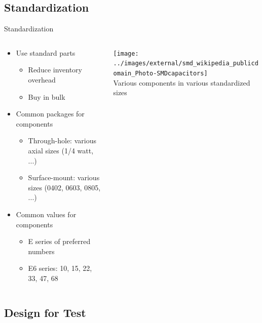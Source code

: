 \documentclass{beamer}
\begin{document}
\subsection{Standardization}
\begin{frame}{Standardization}
  \begin{columns}[T]
    \begin{column}{.6\textwidth}
      \begin{itemize}
        \item Use standard parts
        \begin{itemize}
          \item Reduce inventory overhead
          \item Buy in bulk
        \end{itemize}
        \item Common packages for components
        \begin{itemize}
          \item Through-hole: various axial sizes (1/4 watt, ...)
          \item Surface-mount: various sizes (0402, 0603, 0805, ...)
        \end{itemize}
        \item Common values for components
        \begin{itemize}
          \item E series of preferred numbers
          \item E6 series: 10, 15, 22, 33, 47, 68
        \end{itemize}
      \end{itemize}
    \end{column}

    \begin{column}{0.4\textwidth} \centering
      \texttt{[image: ../images/external/smd\_wikipedia\_publicdomain\_Photo-SMDcapacitors]} \\
      Various components in various standardized sizes
    \end{column}
  \end{columns}
\end{frame}

\subsection{Design for Test}
\end{document}
